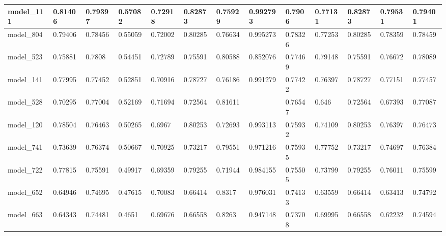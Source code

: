 \begin{tabular}{|l|l|l|l|l|l|l|l|l|l|l|l|l|}
model\_111     & 0.81406     & 0.79397        & 0.57082      & 0.72918          & 0.82873              & 0.75929              & 0.992793     & 0.7906            & 0.77131            & 0.82873         & 0.79531     & 0.79401      \\ \hline
model\_804     & 0.79406     & 0.78456        & 0.55059      & 0.72002          & 0.80285              & 0.76634              & 0.995273     & 0.78326           & 0.77253            & 0.80285         & 0.78359     & 0.78459      \\ \hline
model\_523     & 0.75881     & 0.7808         & 0.54451      & 0.72789          & 0.75591              & 0.80588              & 0.852076     & 0.77469           & 0.79148            & 0.75591         & 0.76672     & 0.78089      \\ \hline
model\_141     & 0.77995     & 0.77452        & 0.52851      & 0.70916          & 0.78727              & 0.76186              & 0.991279     & 0.77422           & 0.76397            & 0.78727         & 0.77151     & 0.77457      \\ \hline
model\_528     & 0.70295     & 0.77004        & 0.52169      & 0.71694          & 0.72564              & 0.81611              &              & 0.76547           & 0.646              & 0.72564         & 0.67393     & 0.77087      \\ \hline
model\_120     & 0.78504     & 0.76463        & 0.50265      & 0.6967           & 0.80253              & 0.72693              & 0.993113     & 0.75932           & 0.74109            & 0.80253         & 0.76397     & 0.76473      \\ \hline
model\_741     & 0.73639     & 0.76374        & 0.50667      & 0.70925          & 0.73217              & 0.79551              & 0.971216     & 0.75935           & 0.77752            & 0.73217         & 0.74697     & 0.76384      \\ \hline
model\_722     & 0.77815     & 0.75591        & 0.49917      & 0.69359          & 0.79255              & 0.71944              & 0.984155     & 0.75505           & 0.73799            & 0.79255         & 0.76011     & 0.75599      \\ \hline
model\_652     & 0.64946     & 0.74695        & 0.47615      & 0.70083          & 0.66414              & 0.8317               & 0.976031     & 0.74133           & 0.63559            & 0.66414         & 0.63413     & 0.74792      \\ \hline
model\_663     & 0.64343     & 0.74481        & 0.4651       & 0.69676          & 0.66558              & 0.8263               & 0.947148     & 0.73708           & 0.69995            & 0.66558         & 0.62232     & 0.74594      \\ \hline

\end{tabular}
